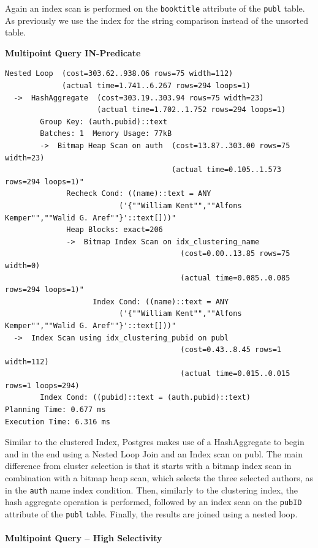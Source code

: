 \documentclass[11pt]{scrartcl}
\begin{document}
Again an index scan is performed on the \texttt{booktitle} attribute of the \texttt{publ} table.
As previously we use the index for the string comparison instead of the unsorted table.

\textbf{Multipoint Query IN-Predicate}
{\small
\parskip0pt\begin{verbatim}
Nested Loop  (cost=303.62..938.06 rows=75 width=112)
             (actual time=1.741..6.267 rows=294 loops=1)
  ->  HashAggregate  (cost=303.19..303.94 rows=75 width=23)
                     (actual time=1.702..1.752 rows=294 loops=1)
        Group Key: (auth.pubid)::text
        Batches: 1  Memory Usage: 77kB
        ->  Bitmap Heap Scan on auth  (cost=13.87..303.00 rows=75 width=23)
                                      (actual time=0.105..1.573 rows=294 loops=1)"
              Recheck Cond: ((name)::text = ANY
                          ('{""William Kent"",""Alfons Kemper"",""Walid G. Aref""}'::text[]))"
              Heap Blocks: exact=206
              ->  Bitmap Index Scan on idx_clustering_name
                                        (cost=0.00..13.85 rows=75 width=0)
                                        (actual time=0.085..0.085 rows=294 loops=1)"
                    Index Cond: ((name)::text = ANY
                          ('{""William Kent"",""Alfons Kemper"",""Walid G. Aref""}'::text[]))"
  ->  Index Scan using idx_clustering_pubid on publ
                                        (cost=0.43..8.45 rows=1 width=112)
                                        (actual time=0.015..0.015 rows=1 loops=294)
        Index Cond: ((pubid)::text = (auth.pubid)::text)
Planning Time: 0.677 ms
Execution Time: 6.316 ms
\end{verbatim}}

Similar to the clustered Index, Postgres makes use of a HashAggregate to begin and in the end using a Nested Loop Join and an Index scan on publ.
The main difference from cluster selection is that it starts with a bitmap index scan in combination with a bitmap heap scan, which selects the three selected authors, as in the \texttt{auth} name index condition.
Then, similarly to the clustering index, the hash aggregate operation is performed, followed by an index scan on the \texttt{pubID} attribute of the \texttt{publ} table.
Finally, the results are joined using a nested loop.

\paragraph{Multipoint Query -- High Selectivity}
\end{document}
